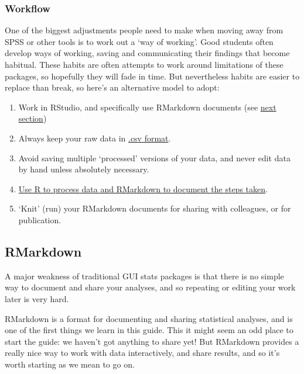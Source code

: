 \documentclass[]{article}
\theoremstyle{definition}
\theoremstyle{definition}
\theoremstyle{definition}
\theoremstyle{remark}
\begin{document}
\subsubsection*{Workflow}\label{start-here}

One of the biggest adjustments people need to make when moving away from
SPSS or other tools is to work out a `way of working'. Good students
often develop ways of working, saving and communicating their findings
that become habitual. These habits are often attempts to work around
limitations of these packages, so hopefully they will fade in time. But
nevertheless habits are easier to replace than break, so here's an
alternative model to adopt:

\begin{enumerate}
\def\labelenumi{\arabic{enumi}.}
\item
  Work in RStudio, and specifically use RMarkdown documents (see
  \protect\hyperlink{rmarkdown}{next section})
\item
  Always keep your raw data in \protect\hyperlink{use-csv}{.csv format}.
\item
  Avoid saving multiple `processed' versions of your data, and never
  edit data by hand unless absolutely necessary.
\item
  \protect\hyperlink{save-intermediate-steps}{Use R to process data and
  RMarkdown to document the steps taken}.
\item
  `Knit' (run) your RMarkdown documents for sharing with colleagues, or
  for publication.
\end{enumerate}

\hypertarget{rmarkdown}{\subsection*{RMarkdown}\label{rmarkdown}}

A major weakness of traditional GUI stats packages is that there is no
simple way to document and share your analyses, and so repeating or
editing your work later is very hard.

RMarkdown is a format for documenting and sharing statistical analyses,
and is one of the first things we learn in this guide. This it might
seem an odd place to start the guide: we haven't got anything to share
yet! But RMarkdown provides a really nice way to work with data
interactively, and share results, and so it's worth starting as we mean
to go on.
\end{document}
